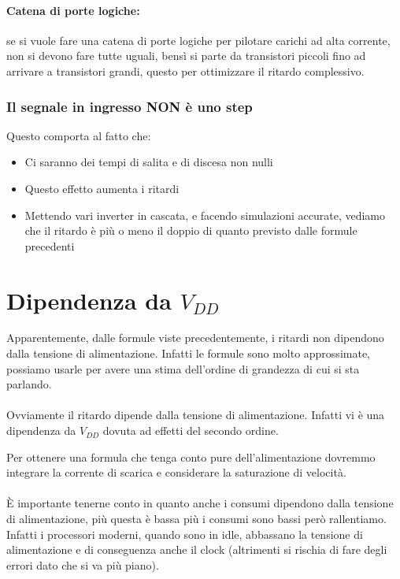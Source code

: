 \paragraph{Catena di porte logiche: } se si vuole fare una catena di porte logiche per pilotare carichi ad alta corrente, non si devono fare tutte uguali, bensì si parte da transistori piccoli fino ad arrivare a transistori grandi, questo per ottimizzare il ritardo complessivo.


\subsubsection{Il segnale in ingresso NON è uno step}

Questo comporta al fatto che:

\begin{itemize}
    \item Ci	saranno dei tempi	di	salita e	di	discesa non	nulli
    \item Questo effetto aumenta i ritardi
    \item Mettendo vari inverter	in	cascata,	e	facendo simulazioni accurate,	vediamo che il ritardo è più o	meno il doppio di	 quanto previsto dalle formule precedenti
\end{itemize}


\newpage
\section{Dipendenza da $V_{DD}$}
Apparentemente, dalle formule viste precedentemente, i ritardi non	dipendono dalla tensione di	alimentazione. Infatti le formule sono molto approssimate, possiamo usarle per avere una stima dell'ordine di grandezza di cui si sta parlando.

\paragraph{}
Ovviamente il ritardo dipende dalla tensione di alimentazione. Infatti vi	è una dipendenza da	$V_{DD}$
dovuta ad	effetti del	secondo ordine.

Per ottenere una formula che tenga conto pure dell'alimentazione dovremmo integrare la	corrente di
scarica e	considerare la	saturazione di	velocità.

\paragraph{}
È importante tenerne conto in quanto anche i consumi dipendono dalla tensione di alimentazione, più questa è bassa più i consumi sono bassi però rallentiamo. Infatti i processori moderni, quando sono in idle, abbassano la tensione di alimentazione e di conseguenza anche il clock (altrimenti si rischia di fare degli errori dato che si va più piano).



